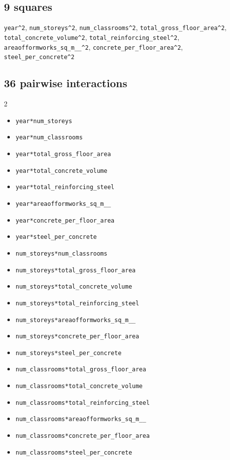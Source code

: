\documentclass[11pt]{article}
\begin{document}
\subsection*{9 squares}
\noindent\small
\verb|year^2|, \verb|num_storeys^2|, \verb|num_classrooms^2|, \verb|total_gross_floor_area^2|, \verb|total_concrete_volume^2|, \verb|total_reinforcing_steel^2|, \verb|areaofformworks_sq_m__^2|, \verb|concrete_per_floor_area^2|, \verb|steel_per_concrete^2|
\normalsize

\subsection*{36 pairwise interactions}
\footnotesize
\begin{multicols}{2}
\begin{itemize}[leftmargin=*]
  \item \verb|year*num_storeys|\item \verb|year*num_classrooms|\item \verb|year*total_gross_floor_area|\item \verb|year*total_concrete_volume|\item \verb|year*total_reinforcing_steel|\item \verb|year*areaofformworks_sq_m__|\item \verb|year*concrete_per_floor_area|\item \verb|year*steel_per_concrete|
  \item \verb|num_storeys*num_classrooms|\item \verb|num_storeys*total_gross_floor_area|\item \verb|num_storeys*total_concrete_volume|\item \verb|num_storeys*total_reinforcing_steel|\item \verb|num_storeys*areaofformworks_sq_m__|\item \verb|num_storeys*concrete_per_floor_area|\item \verb|num_storeys*steel_per_concrete|
  \item \verb|num_classrooms*total_gross_floor_area|\item \verb|num_classrooms*total_concrete_volume|\item \verb|num_classrooms*total_reinforcing_steel|\item \verb|num_classrooms*areaofformworks_sq_m__|\item \verb|num_classrooms*concrete_per_floor_area|\item \verb|num_classrooms*steel_per_concrete|

\end{itemize}
\end{multicols}
\end{document}
